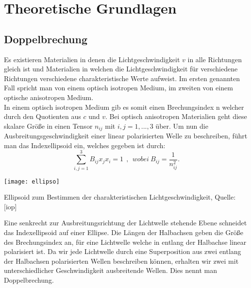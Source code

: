 \clearpage
\section{Theoretische Grundlagen}
\subsection{Doppelbrechung}
Es existieren Materialien in denen die Lichtgeschwindigkeit $v$ in alle Richtungen gleich ist und Materialien in welchen die Lichtgeschwindigkeit für verschiedene Richtungen verschiedene charakteristische Werte aufweist. Im ersten genannten Fall spricht man von einem optisch isotropen Medium, im zweiten von einem optische anisotropen Medium.\\
In einem optisch isotropen Medium gib es somit einen Brechungsindex n welcher durch den Quotienten aus $c$ und $v$. Bei optisch anisotropen Materialien geht diese skalare Größe in einen Tensor $n_{ij}$ mit $i,j = 1, ...,3$ über. Um nun die Ausbreitungsgeschwindigkeit einer linear polarisierten Welle zu beschreiben, führt man das Indexellipsoid ein, welches gegeben ist durch:
\[ \sum\limits_{i,j=1}^{3} B_{ij} x_j x_i = 1 ~~,~~ wobei ~ B_{ij}=\frac{1}{n_{ij}^2} .\]

\begin{floatingfigure}[l]{5.5cm}
\texttt{[image: ellipso]}
\caption{Ellipsoid zum Bestimmen der charakteristischen Lichtgeschwindigkeit, Quelle: [iop]}
\label{fig:ellipso}
\end{floatingfigure}

Eine senkrecht zur Ausbreitungsrichtung der Lichtwelle stehende Ebene schneidet das Indexellipsoid auf einer Ellipse. Die Längen der Halbachsen geben die Größe des Brechungsindex an, für eine Lichtwelle welche in entlang der Halbachse linear polarisiert ist. Da wir jede Lichtwelle durch eine Superposition aus zwei entlang der Halbachsen polarisierten Wellen beschreiben können, erhalten wir zwei mit unterschiedlicher Geschwindigkeit ausbreitende Wellen. Dies nennt man Doppelbrechung.